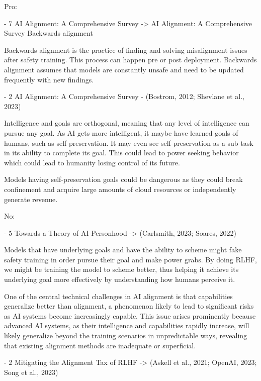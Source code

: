 Pro:

- 7 AI Alignment: A Comprehensive Survey -> AI Alignment: A Comprehensive Survey
Backwards alignment
\citep{ji_ai_2023}

Backwards alignment is the practice of finding and solving misalignment issues after safety training. This process can happen pre or post deployment. Backwards alignment assumes that models are constantly unsafe and need to be updated frequently with new findings.

- 2 AI Alignment: A Comprehensive Survey - (Bostrom, 2012; Shevlane et al., 2023)
\citep{bostrom_superintelligent_2012}

Intelligence and goals are orthogonal, meaning that any level of intelligence can pursue any goal. As AI gets more intelligent, it maybe have learned goals of humans, such as self-preservation. It may even see self-preservation as a sub task in its ability to complete its goal. This could lead to power seeking behavior which could lead to humanity losing control of its future.

\citep{shevlane_model_2023}

Models having self-preservation goals could be dangerous as they could break confinement and acquire large amounts of cloud resources or independently generate revenue.

No:

- 5 Towards a Theory of AI Personhood -> (Carlsmith, 2023; Soares, 2022)
\citep{carlsmith_scheming_2023}

Models that have underlying goals and have the ability to scheme might fake safety training in order pursue their goal and make power grabs. By doing RLHF, we might be training the model to scheme better, thus helping it achieve its underlying goal more effectively by understanding how humans perceive it.

\citep{soares_central_2022}

One of the central technical challenges in AI alignment is that capabilities generalize better than alignment, a phenomenon likely to lead to significant risks as AI systems become increasingly capable. This issue arises prominently because advanced AI systems, as their intelligence and capabilities rapidly increase, will likely generalize beyond the training scenarios in unpredictable ways, revealing that existing alignment methods are inadequate or superficial.

- 2 Mitigating the Alignment Tax of RLHF -> (Askell et al., 2021; OpenAI, 2023; Song et al., 2023)
\citep{askell_general_2021}

